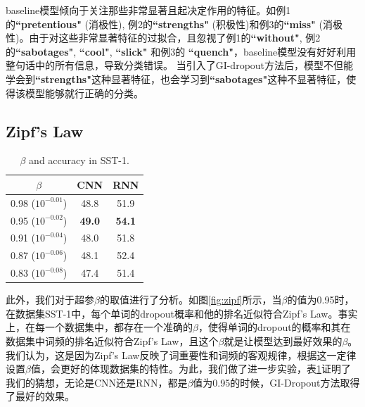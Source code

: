 baseline模型倾向于关注那些非常显著且起决定作用的特征。如例1的\textbf{``pretentious"} (消极性), 例2的\textbf{``strengths"} (积极性)和例3的\textbf{``miss"} (消极性)。由于对这些非常显著特征的过拟合，且忽视了例1的\textbf{``without"}, 例2的\textbf{``sabotages"}, \textbf{``cool"}, \textbf{``slick"} 和例3的 \textbf{``quench"}，baseline模型没有好好利用整句话中的所有信息，导致分类错误。
当引入了GI-dropout方法后，模型不但能学会到\textbf{``strengths"}这种显著特征，也会学习到\textbf{``sabotages"}这种不显著特征，使得该模型能够就行正确的分类。

\subsection{Zipf's Law}


\begin{table}[!t]
\centering
\begin{tabular}{c | c c}
\hline
\bfseries $\beta$ & CNN &  RNN\\
\hline
0.98 ($10^{-0.01}$) & 48.8 & 51.9 \\
0.95 ($10^{-0.02}$) & \textbf{49.0} & \textbf{54.1} \\
0.91 ($10^{-0.04}$) & 48.0 & 51.8 \\
0.87 ($10^{-0.06}$) & 48.1 & 52.4 \\
0.83 ($10^{-0.08}$) & 47.4 & 51.4 \\

\hline
\hline
\end{tabular}
\caption{$\beta$ and accuracy in SST-1. }
\label{table: SST-1}
\end{table}

此外，我们对于超参$\beta$的取值进行了分析。如图\ref{fig:zipf}所示，当$\beta$的值为0.95时，在数据集SST-1中，每个单词的dropout概率和他的排名近似符合Zipf's Law。事实上，在每一个数据集中，都存在一个准确的$\beta$，使得单词的dropout的概率和其在数据集中词频的排名近似符合Zipf's Law，且这个$\beta$就是让模型达到最好效果的$\beta$。我们认为，这是因为Zipf's Law反映了词重要性和词频的客观规律，根据这一定律设置$\beta$值，会更好的体现数据集的特性。为此，我们做了进一步实验，表\ref{table: SST-1}证明了我们的猜想，无论是CNN还是RNN，都是$\beta$值为0.95的时候，GI-Dropout方法取得了最好的效果。




